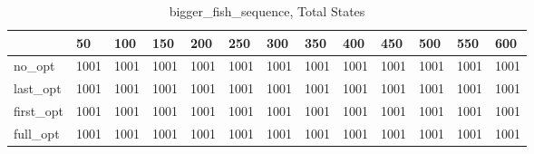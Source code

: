 \begin{table}
\caption{bigger\_fish\_sequence, Total States}
\label{bigger_fish_sequence_total}
\begin{tabular}{lllllllllllll}
\toprule
 & 50 & 100 & 150 & 200 & 250 & 300 & 350 & 400 & 450 & 500 & 550 & 600 \\
\midrule
no\_opt & 1001 & 1001 & 1001 & 1001 & 1001 & 1001 & 1001 & 1001 & 1001 & 1001 & 1001 & 1001 \\
last\_opt & 1001 & 1001 & 1001 & 1001 & 1001 & 1001 & 1001 & 1001 & 1001 & 1001 & 1001 & 1001 \\
first\_opt & 1001 & 1001 & 1001 & 1001 & 1001 & 1001 & 1001 & 1001 & 1001 & 1001 & 1001 & 1001 \\
full\_opt & 1001 & 1001 & 1001 & 1001 & 1001 & 1001 & 1001 & 1001 & 1001 & 1001 & 1001 & 1001 \\
\bottomrule
\end{tabular}
\end{table}
